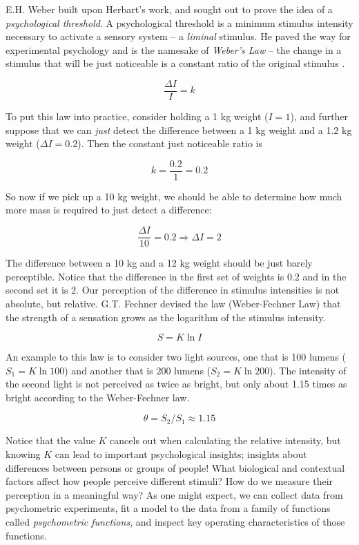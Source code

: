 \documentclass[11pt, oneside, openany]{scrbook}
\begin{document}
E.H. Weber built upon Herbart's work, and sought out to prove the idea of a \emph{psychological threshold}. A psychological threshold is a minimum stimulus intensity necessary to activate a sensory system -- a \emph{liminal} stimulus. He paved the way for experimental psychology and is the namesake of \emph{Weber's Law} -- the change in a stimulus that will be just noticeable is a constant ratio of the original stimulus \citep{britannica2014editors}.

\[
\frac{\Delta I}{I} = k
\]

To put this law into practice, consider holding a 1 kg weight (\(I = 1\)), and further suppose that we can \emph{just} detect the difference between a 1 kg weight and a 1.2 kg weight (\(\Delta I = 0.2\)). Then the constant just noticeable ratio is

\[
k = \frac{0.2}{1} = 0.2
\]

So now if we pick up a 10 kg weight, we should be able to determine how much more mass is required to just detect a difference:

\[
\frac{\Delta I}{10} = 0.2 \Rightarrow \Delta I = 2
\]

The difference between a 10 kg and a 12 kg weight should be just barely perceptible. Notice that the difference in the first set of weights is 0.2 and in the second set it is 2. Our perception of the difference in stimulus intensities is not absolute, but relative. G.T. Fechner devised the law (Weber-Fechner Law) that the strength of a sensation grows as the logarithm of the stimulus intensity.

\[S = K \ln I\]

An example to this law is to consider two light sources, one that is 100 lumens (\(S_1 = K \ln 100\)) and another that is 200 lumens (\(S_2 = K \ln 200\)). The intensity of the second light is not perceived as twice as bright, but only about 1.15 times as bright according to the Weber-Fechner law.

\[\theta = S_2 / S_1 \approx 1.15\]

Notice that the value \(K\) cancels out when calculating the relative intensity, but knowing \(K\) can lead to important psychological insights; insights about differences between persons or groups of people! What biological and contextual factors affect how people perceive different stimuli? How do we measure their perception in a meaningful way? As one might expect, we can collect data from psychometric experiments, fit a model to the data from a family of functions called \emph{psychometric functions}, and inspect key operating characteristics of those functions.
\end{document}
